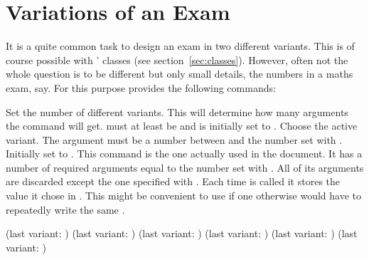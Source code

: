 \documentclass[DIV10,toc=index,toc=bib,numbers=noendperiod]{cnpkgdoc}
\begin{document}
\section{Variations of an Exam}
\noindent{}It is a quite common task to design an exam in two
different variants.  This is of course possible with \ExSheets' classes (see
section~\ref{sec:classes}).  However, often not the whole question is to be
different but only small details, the numbers in a maths exam, say.  For this
purpose \ExSheets provides the following commands:
\begin{beschreibung}
  \newline
    Set the number of different variants.  This will determine how many
    arguments the command  will get.   must at least be
     and is initially set to .
  \newline
    Choose the active variant.  The argument must be a number between 
    and the number set with .  Initially set to .
  \newline
    This command is the one actually used in the document.  It has a number of
    required arguments equal to the number set with .  All
    of its arguments are discarded except the one specified with
    .
  \newline%
    Each time  is called it stores the value it
    chose in .  This might be convenient to use if one
    otherwise would have to repeatedly write the same .
\end{beschreibung}

\begin{beispiel}
 (last variant: \lastvariant)
 (last variant: \lastvariant)
 (last variant: \lastvariant)
 (last variant: \lastvariant)
 (last variant: \lastvariant)
 (last variant: \lastvariant)
\end{beispiel}
\end{document}
